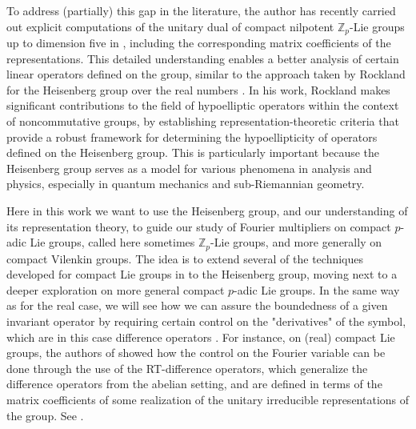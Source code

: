 \documentclass[12pt, reqno]{amsart}
\newcommand{\Z}{\mathbb{Z}}
\newcommand{\1}{\mathds{1}}
\begin{document}
To address (partially) this gap in the literature, the author has recently carried out explicit computations of the unitary dual of compact nilpotent $\Z_p$-Lie groups up to dimension five in \cite{velasquezrodriguez2024heisenberg, 2024arXiv240706289V, VelasquezRodriguez2025}, including the corresponding matrix coefficients of the representations. This detailed understanding enables a better analysis of certain linear operators defined on the group, similar to the approach taken by Rockland for the Heisenberg group over the real numbers \cite{Rockland1978}. In his work, Rockland makes significant contributions to the field of hypoelliptic operators within the context of noncommutative groups, by establishing representation-theoretic criteria that provide a robust framework for determining the hypoellipticity of operators defined on the Heisenberg group. This is particularly important because the Heisenberg group serves as a model for various phenomena in analysis and physics, especially in quantum mechanics and sub-Riemannian geometry.

Here in this work we want to use the Heisenberg group, and our understanding of its representation theory, to guide our study of Fourier multipliers on compact $p$-adic Lie groups, called here sometimes $\Z_p$-Lie groups, and more generally on compact Vilenkin groups. The idea is to extend several of the techniques developed for compact Lie groups in \cite{Ruzhansky2010} to the Heisenberg group, moving next to a deeper exploration on more general compact $p$-adic Lie groups. In the same way as for the real case, we will see how we can assure the boundedness of a given invariant operator by requiring certain control on the "derivatives" of the symbol, which are in this case difference operators \cite{Fischer2015, Fischer2020}. For instance, on (real) compact Lie groups, the authors of \cite{Ruzhansky2015} showed how the control on the Fourier variable can be done through the use of the RT-difference operators, which generalize the difference operators from the abelian setting, and are defined in terms of the matrix coefficients of some realization of the unitary irreducible representations of the group. See \cite{Fischer2015, Fischer2020}.
\end{document}
